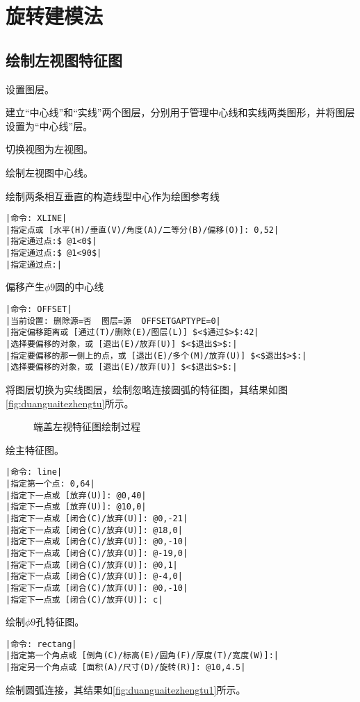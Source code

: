 \section{旋转建模法}
\subsection{绘制左视图特征图}
\begin{procedure}
\item 设置图层。

建立“中心线”和“实线”两个图层，分别用于管理中心线和实线两类图形，并将图层设置为“中心线”层。
\item 切换视图为左视图。

\item 绘制左视图中心线。

绘制两条相互垂直的构造线型中心作为绘图参考线
\begin{lstlisting}
|命令: XLINE|
|指定点或 [水平(H)/垂直(V)/角度(A)/二等分(B)/偏移(O)]: 0,52|
|指定通过点:$ @1<0$|
|指定通过点:$ @1<90$|
|指定通过点:|
\end{lstlisting}
偏移产生$\phi 9$圆的中心线
\begin{lstlisting}
|命令: OFFSET|
|当前设置: 删除源=否  图层=源  OFFSETGAPTYPE=0|
|指定偏移距离或 [通过(T)/删除(E)/图层(L)] $<$通过$>$:42|
|选择要偏移的对象，或 [退出(E)/放弃(U)] $<$退出$>$:|
|指定要偏移的那一侧上的点，或 [退出(E)/多个(M)/放弃(U)] $<$退出$>$:|
|选择要偏移的对象，或 [退出(E)/放弃(U)] $<$退出$>$:|
\end{lstlisting}
\item 将图层切换为实线图层，绘制忽略连接圆弧的特征图，其结果如图\ref{fig:duanguaitezhengtu}所示。
\begin{figure}[htbp]
\centering
{}\hspace{30pt}
\caption{端盖左视特征图绘制过程}
\end{figure}
绘主特征图。
\begin{lstlisting}
|命令: line|
|指定第一个点: 0,64|
|指定下一点或 [放弃(U)]: @0,40|
|指定下一点或 [放弃(U)]: @10,0|
|指定下一点或 [闭合(C)/放弃(U)]: @0,-21|
|指定下一点或 [闭合(C)/放弃(U)]: @18,0|
|指定下一点或 [闭合(C)/放弃(U)]: @0,-10|
|指定下一点或 [闭合(C)/放弃(U)]: @-19,0|
|指定下一点或 [闭合(C)/放弃(U)]: @0,1|
|指定下一点或 [闭合(C)/放弃(U)]: @-4,0|
|指定下一点或 [闭合(C)/放弃(U)]: @0,-10|
|指定下一点或 [闭合(C)/放弃(U)]: c|
\end{lstlisting}
绘制$\phi 9$孔特征图。
\begin{lstlisting}
|命令: rectang|
|指定第一个角点或 [倒角(C)/标高(E)/圆角(F)/厚度(T)/宽度(W)]:|
|指定另一个角点或 [面积(A)/尺寸(D)/旋转(R)]: @10,4.5|
\end{lstlisting}
\item 绘制圆弧连接，其结果如\ref{fig:duanguaitezhengtu1}所示。


\end{procedure}
